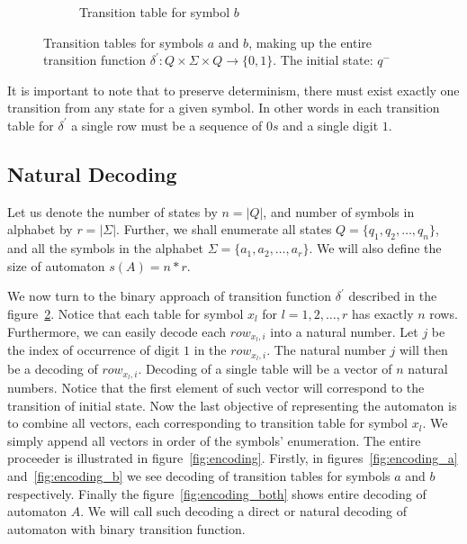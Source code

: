 \documentclass{mini}
\begin{document}
\begin{figure}[H]
\begin{center}
\begin{subfigure}{.5\textwidth}
\begin{tabular}{|P{1.0cm} || P{0.8cm} | P{0.8cm} | P{0.8cm} | P{0.8cm}|}
            \end{tabular}
            
            \caption{Transition table for symbol $b$}
            \label{fig:ttable_bin_b}
            
        \end{subfigure}%
        
        
        \caption{Transition tables for symbols $a$ and $b$, making up the entire transition function $\delta^{'}: Q \times \Sigma \times Q \rightarrow \{0,1\}$. The initial state: $q^-$}
        
        \label{fig:ttable_bin}
    \end{center}
\end{figure}

It is important to note that to preserve determinism, there must exist exactly one transition from any state for a given symbol. In other words in each transition table for $\delta^{'}$ a single row must be a sequence of $0s$ and a single digit $1$.

\subsection{Natural Decoding} \label{sec:auto_dec}

Let us denote the number of states by $n = |Q|$, and number of symbols in alphabet by $r = |\Sigma|$. Further, we shall enumerate all states 	$Q = \{q_1, q_2, \ldots, q_n\}$, and all the symbols in the alphabet 	$\Sigma = \{a_1, a_2, \ldots, a_r\}$. We will also define the size of automaton $s(A) = n*r$.

We now turn to the binary approach of transition function $\delta^{'}$ described in the figure~\ref{fig:ttable_bin}. Notice that each table for symbol $x_l$ for $l = 1,2, \dots, r$ has exactly $n$ rows. Furthermore, we can easily decode each $row_{x_l, i}$ into a natural number. Let $j$ be the index of occurrence of digit $1$ in the $row_{x_l, i}$. The natural number $j$ will then be a decoding of $row_{x_l, i}$. Decoding of a single table will be a vector of $n$ natural numbers. Notice that the first element of such vector will correspond to the transition of initial state. Now the last objective of representing the automaton is to combine all vectors, each corresponding to transition table for symbol $x_{l}$. We simply append all vectors in order of the symbols' enumeration. The entire proceeder is illustrated in figure~\ref{fig:encoding}. Firstly, in figures~\ref{fig:encoding_a} and~\ref{fig:encoding_b} we see decoding of transition tables for symbols $a$ and $b$ respectively. Finally the figure~\ref{fig:encoding_both} shows entire decoding of automaton $A$. We will call such decoding a direct or natural decoding of automaton with binary transition function.
\end{document}
